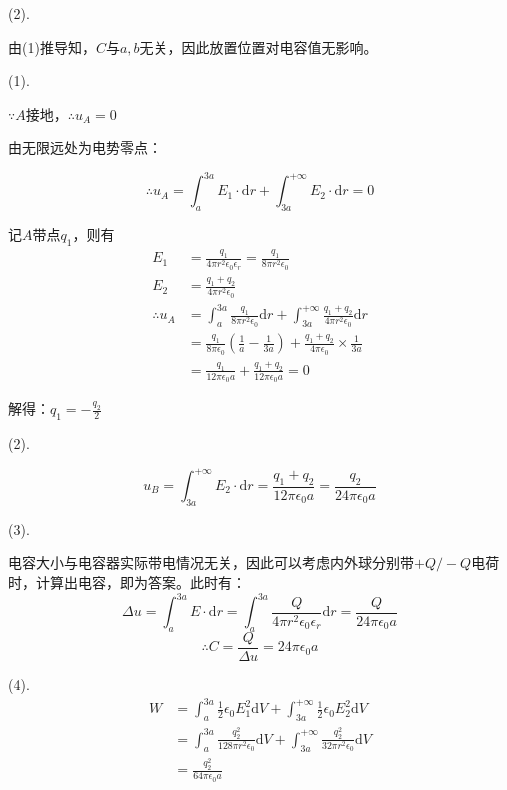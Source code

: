 \documentclass[b5paper,opensource]{qyxf-book}
\newcommand{\di}[1]{\mathrm{d}#1}
\begin{document}
(2).

由(1)推导知，$ C $与$ a,b $无关，因此放置位置对电容值无影响。


\solve 
(1).

$ \because A$接地，$ \therefore u_A=0 $

由无限远处为电势零点：

\begin{equation}
\therefore u_A=\int_a^{3a} E_1\cdot\di{r} +\int_{3a}^{+\infty} E_2\cdot\di{r} =0
\end{equation}

记$ A $带点$ q_1 $，则有
\begin{equation}
\begin{aligned}
E_1&=\frac{q_1}{4\pi r^2\epsilon_0\epsilon_r}=\frac{q_1}{8\pi r^2\epsilon_0}\\
E_2&=\frac{q_1+q_2}{4\pi r^2\epsilon_0}\\
\therefore u_A&=\int_a^{3a}\frac{q_1}{8\pi r^2\epsilon_0}\di{r}+\int_{3a}^{+\infty}\frac{q_1+q_2}{4\pi r^2\epsilon_0}\di{r}\\
&=\frac{q_1}{8\pi\epsilon_0}\left(\frac{1}{a}-\frac{1}{3a}\right)+\frac{q_1+q_2}{4\pi\epsilon_0}\times \frac{1}{3a}\\
&=\frac{q_1}{12\pi\epsilon_0a}+\frac{q_1+q_2}{12\pi\epsilon_0a}=0
\end{aligned}
\end{equation}

解得：$ q_1=-\frac{q_2}{2} $

(2).

\[u_B=\int_{3a}^{+\infty}E_2\cdot \di{r}=\frac{q_1+q_2}{12\pi\epsilon_0a}=\frac{q_2}{24\pi\epsilon_0a}\]

(3).

电容大小与电容器实际带电情况无关，因此可以考虑内外球分别带$ +Q/-Q $电荷时，计算出电容，即为答案。此时有：
\[\Delta u=\int_a^{3a}E\cdot \di{r}=\int_a^{3a}\frac{Q}{4\pi r^2\epsilon_0\epsilon_r}\di{r}=\frac{Q}{24\pi\epsilon_0a}\]
\[\therefore C=\frac{Q}{\Delta u}=24\pi\epsilon_0a\]

(4).
\begin{align*}
W&=\int_a^{3a}\frac{1}{2}\epsilon_0 E_1^2\di{V}+\int_{3a}^{+\infty}\frac{1}{2}\epsilon_0 E_2^2\di{V}\\
&=\int_a^{3a}\frac{q_2^2}{128\pi r^2\epsilon_0} \di{V}+\int_{3a}^{+\infty}\frac{q_2^2}{32\pi r^2\epsilon_0}\di{V}\\
&=\frac{q_2^2}{64\pi\epsilon_0a}
\end{align*}
\end{document}

